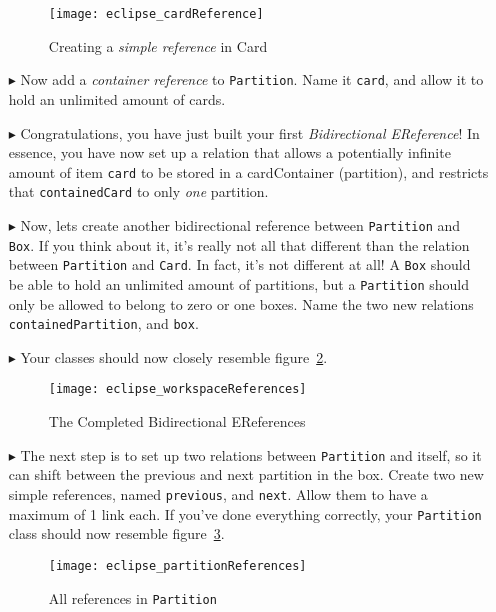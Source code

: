 \begin{itemize}
\begin{figure}[htbp]
	\centering
  \texttt{[image: eclipse\_cardReference]}
	\caption{Creating a \emph{simple reference} in Card}
	\label{fig:cardReference}
\end{figure} 

\item[$\blacktriangleright$] Now add a \emph{container reference} to \texttt{Partition}. Name it \texttt{card}, and allow it to hold an unlimited amount of cards.

\item[$\blacktriangleright$] Congratulations, you have just built your first \emph{Bidirectional EReference}! In essence, you have now set up a relation that allows a potentially infinite amount of item \texttt{card} to be stored in a cardContainer (partition), and restricts that \texttt{containedCard} to only \emph{one} partition.

\item[$\blacktriangleright$] Now, lets create another bidirectional reference between \texttt{Partition} and \texttt{Box}. If you think about it, it's really not all that different than the relation between \texttt{Partition} and \texttt{Card}. In fact, it's not different at all! A \texttt{Box} should be able to hold an unlimited amount of partitions, but a \texttt{Partition} should only be allowed to belong to zero or one boxes. Name the two new relations \texttt{containedPartition}, and \texttt{box}. 

\item[$\blacktriangleright$] Your classes should now closely resemble figure~\ref{fig:allReferences}.


\begin{figure}[htbp]
	\centering
  \texttt{[image: eclipse\_workspaceReferences]}
	\caption{The Completed Bidirectional EReferences}
	\label{fig:allReferences}
\end{figure} 


\item[$\blacktriangleright$] The next step is to set up two relations between \texttt{Partition} and itself, so it can shift between the previous and next partition in the box. Create two new simple references, named \texttt{previous}, and \texttt{next}. Allow them to have a maximum of 1 link each. If you've done everything correctly, your \texttt{Partition} class should now resemble figure~\ref{fig:partitionReferences}.

\begin{figure}[htbp]
	\centering
  \texttt{[image: eclipse\_partitionReferences]}
	\caption{All references in \texttt{Partition}}
	\label{fig:partitionReferences}
\end{figure} 


\end{itemize}
